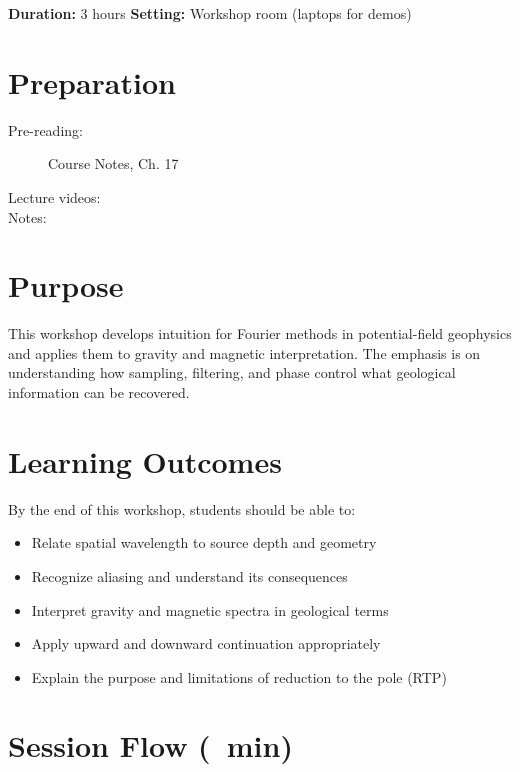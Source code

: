 
\workshopstart

\vspace{-0.75em}
\noindent\textbf{Duration:} 3 hours \hfill \textbf{Setting:} Workshop room (laptops for demos)

\section*{Preparation}

\begin{description}
  \item[Pre-reading:] Course Notes, Ch. 17
  \item[Lecture videos:]
  \item[Notes:]
\end{description}

\section*{Purpose}

This workshop develops intuition for Fourier methods in potential-field geophysics
and applies them to gravity and magnetic interpretation.
The emphasis is on understanding how sampling, filtering, and phase
control what geological information can be recovered.

\section*{Learning Outcomes}

By the end of this workshop, students should be able to:
\begin{itemize}
  \item Relate spatial wavelength to source depth and geometry
  \item Recognize aliasing and understand its consequences
  \item Interpret gravity and magnetic spectra in geological terms
  \item Apply upward and downward continuation appropriately
  \item Explain the purpose and limitations of reduction to the pole (RTP)
\end{itemize}

\section*{Session Flow (\timelinelength\ min)}

